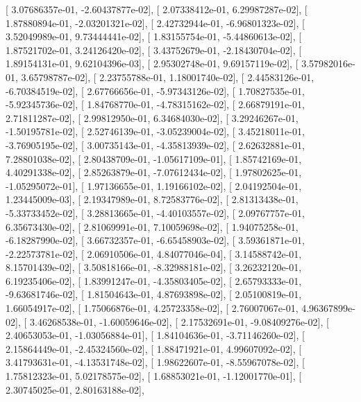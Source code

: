 \documentclass{article}
\begin{document}
       [  3.07686357e-01,  -2.60437877e-02],
       [  2.07338412e-01,   6.29987287e-02],
       [  1.87880894e-01,  -2.03201321e-02],
       [  2.42732944e-01,  -6.96801323e-02],
       [  3.52049989e-01,   9.73444441e-02],
       [  1.83155754e-01,  -5.44860613e-02],
       [  1.87521702e-01,   3.24126420e-02],
       [  3.43752679e-01,  -2.18430704e-02],
       [  1.89154131e-01,   9.62104396e-03],
       [  2.95302748e-01,   9.69157119e-02],
       [  3.57982016e-01,   3.65798787e-02],
       [  2.23755788e-01,   1.18001740e-02],
       [  2.44583126e-01,  -6.70384519e-02],
       [  2.67766656e-01,  -5.97343126e-02],
       [  1.70827535e-01,  -5.92345736e-02],
       [  1.84768770e-01,  -4.78315162e-02],
       [  2.66879191e-01,   2.71811287e-02],
       [  2.99812950e-01,   6.34684030e-02],
       [  3.29246267e-01,  -1.50195781e-02],
       [  2.52746139e-01,  -3.05239004e-02],
       [  3.45218011e-01,  -3.76905195e-02],
       [  3.00735143e-01,  -4.35813939e-02],
       [  2.62632881e-01,   7.28801038e-02],
       [  2.80438709e-01,  -1.05617109e-01],
       [  1.85742169e-01,   4.40291338e-02],
       [  2.85263879e-01,  -7.07612434e-02],
       [  1.97802625e-01,  -1.05295072e-01],
       [  1.97136655e-01,   1.19166102e-02],
       [  2.04192504e-01,   1.23445009e-03],
       [  2.19347989e-01,   8.72583776e-02],
       [  2.81313438e-01,  -5.33733452e-02],
       [  3.28813665e-01,  -4.40103557e-02],
       [  2.09767757e-01,   6.35673430e-02],
       [  2.81069991e-01,   7.10059698e-02],
       [  1.94075258e-01,  -6.18287990e-02],
       [  3.66732357e-01,  -6.65458903e-02],
       [  3.59361871e-01,  -2.22573781e-02],
       [  2.06910506e-01,   4.84077046e-04],
       [  3.14588742e-01,   8.15701439e-02],
       [  3.50818166e-01,  -8.32988181e-02],
       [  3.26232120e-01,   6.19235406e-02],
       [  1.83991247e-01,  -4.35803405e-02],
       [  2.65793333e-01,  -9.63681746e-02],
       [  1.81504643e-01,   4.87693898e-02],
       [  2.05100819e-01,   1.66054917e-02],
       [  1.75066876e-01,   4.25723358e-02],
       [  2.76007067e-01,   4.96367899e-02],
       [  3.46268538e-01,  -1.60059646e-02],
       [  2.17532691e-01,  -9.08409276e-02],
       [  2.40653053e-01,  -1.03056884e-01],
       [  1.84104636e-01,  -3.71146260e-02],
       [  2.15864449e-01,  -2.45324560e-02],
       [  1.88471921e-01,   4.99607092e-02],
       [  3.41793631e-01,  -4.13531748e-02],
       [  1.98622607e-01,  -8.55967078e-02],
       [  1.75812323e-01,   5.02178575e-02],
       [  1.68853021e-01,  -1.12001770e-01],
       [  2.30745025e-01,   2.80163188e-02],
\end{document}

